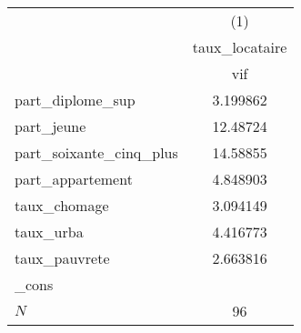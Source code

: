 {
\def\sym#1{\ifmmode^{#1}\else\(^{#1}\)\fi}
\begin{tabular}{l*{1}{c}}
\hline\hline
            &\multicolumn{1}{c}{(1)}\\
            &\multicolumn{1}{c}{taux\_locataire}\\
            &         vif\\
\hline
part\_diplome\_sup&    3.199862\\
part\_jeune  &    12.48724\\
part\_soixante\_cinq\_plus&    14.58855\\
part\_appartement&    4.848903\\
taux\_chomage&    3.094149\\
taux\_urba   &    4.416773\\
taux\_pauvrete&    2.663816\\
\_cons      &            \\
\hline
\(N\)       &          96\\
\hline\hline
\end{tabular}
}
